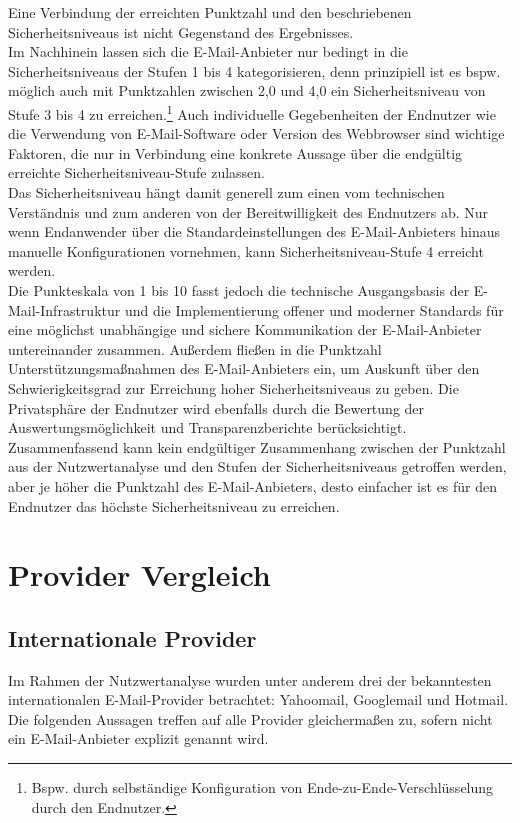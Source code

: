 \documentclass  [paper=a4,
				fontsize=12pt,
				listof=totoc,
				bibliography=totoc
				]{scrreprt}
\begin{document}
			Eine Verbindung der erreichten Punktzahl und den beschriebenen Sicherheitsniveaus ist nicht Gegenstand des Ergebnisses.\medskip\\
			Im Nachhinein lassen sich die E-Mail-Anbieter nur bedingt in die Sicherheitsniveaus der Stufen 1 bis 4 kategorisieren, denn prinzipiell ist es bspw. möglich auch mit Punktzahlen zwischen 2,0 und 4,0 ein Sicherheitsniveau von Stufe 3 bis 4 zu erreichen.\footnote{Bspw. durch selbständige Konfiguration von Ende-zu-Ende-Verschlüsselung durch den Endnutzer.}
			Auch individuelle Gegebenheiten der Endnutzer wie die Verwendung von E-Mail-Software oder Version des Webbrowser sind wichtige Faktoren, die nur in Verbindung eine konkrete Aussage über die endgültig erreichte Sicherheitsniveau-Stufe zulassen.\medskip\\
			Das Sicherheitsniveau hängt damit generell zum einen vom technischen Verständnis und zum anderen von der Bereitwilligkeit des Endnutzers ab. %
			Nur wenn Endanwender über die Standardeinstellungen des E-Mail-Anbieters hinaus manuelle Konfigurationen vornehmen, kann Sicherheitsniveau-Stufe 4 erreicht werden.\medskip\\
			Die Punkteskala von 1 bis 10 fasst jedoch die technische Ausgangsbasis der E-Mail-Infrastruktur und die Implementierung offener und moderner Standards für eine möglichst unabhängige und sichere Kommunikation der E-Mail-Anbieter untereinander zusammen.
			Außerdem fließen in die Punktzahl Unterstützungsmaßnahmen des E-Mail-Anbieters ein, um Auskunft über den Schwierigkeitsgrad zur Erreichung hoher Sicherheitsniveaus zu geben.
			Die Privatsphäre der Endnutzer wird ebenfalls durch die Bewertung der Auswertungsmöglichkeit und Transparenzberichte berücksichtigt.\medskip\\
			Zusammenfassend kann kein endgültiger Zusammenhang zwischen der Punktzahl aus der Nutzwertanalyse und den Stufen der Sicherheitsniveaus getroffen werden, aber je höher die Punktzahl des E-Mail-Anbieters, desto einfacher ist es für den Endnutzer das höchste Sicherheitsniveau zu erreichen.
			
			
		
		\section{Provider Vergleich}\label{sec:provider-vergleich}
			\subsection{Internationale Provider}
			Im Rahmen der Nutzwertanalyse wurden unter anderem drei der bekanntesten internationalen E-Mail-Provider betrachtet: Yahoomail, Googlemail und Hotmail. Die folgenden Aussagen treffen auf alle Provider gleichermaßen zu, sofern nicht ein E-Mail-Anbieter explizit genannt wird.
\end{document}
